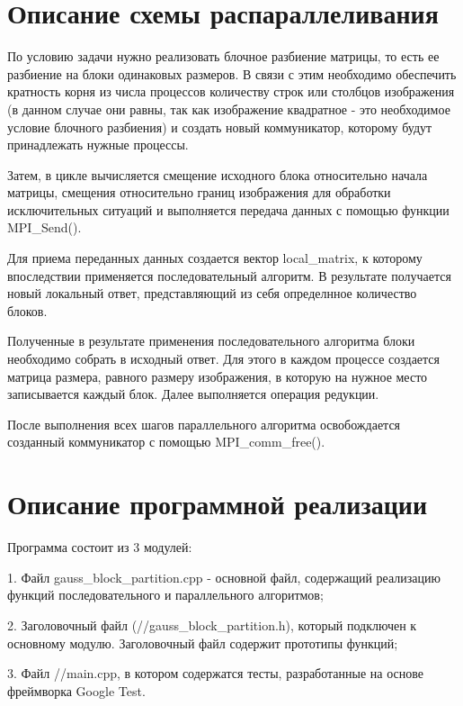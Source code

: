 \documentclass{report}
\begin{document}
\section*{Описание схемы распараллеливания}
\par По условию задачи нужно реализовать блочное разбиение матрицы, то есть ее разбиение на блоки одинаковых размеров. В связи с этим необходимо обеспечить кратность корня из числа процессов количеству строк или столбцов изображения (в данном случае они равны, так как изображение квадратное - это необходимое условие блочного разбиения) и создать новый коммуникатор, которому будут принадлежать нужные процессы. 
\par Затем, в цикле вычисляется смещение исходного блока относительно начала матрицы, смещения относительно границ изображения для обработки исключительных ситуаций и выполняется передача данных с помощью функции MPI\_Send(). 
\par Для приема переданных данных создается вектор local\_matrix, к которому впоследствии применяется последовательный алгоритм. В результате получается новый локальный ответ, представляющий из себя определнное количество блоков. 
\par Полученные в результате применения последовательного алгоритма блоки необходимо собрать в исходный ответ. Для этого в каждом процессе создается матрица размера, равного размеру изображения, в которую на нужное место записывается каждый блок. Далее выполняется операция редукции. 
\par После выполнения всех шагов параллельного алгоритма освобождается созданный коммуникатор с помощью MPI\_comm\_free().
\newpage

\section*{Описание программной реализации}
Программа состоит из 3 модулей: 
\par 1. Файл gauss\_block\_partition.cpp - основной файл, содержащий реализацию функций последовательного и параллельного алгоритмов; 
\par 2. Заголовочный файл (//gauss\_block\_partition.h), который подключен к основному модулю. Заголовочный файл содержит прототипы функций; 
\par 3. Файл //main.cpp, в котором содержатся тесты, разработанные на основе фреймворка Google Test.
\end{document}

